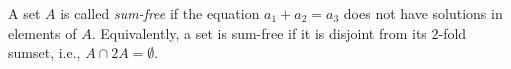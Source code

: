 \documentclass[12pt]{article}
\begin{document}
A set $A$ is called \emph{sum-free} if the equation $a_1+a_2=a_3$ does not have solutions in elements of $A$. Equivalently, a set is sum-free if it is disjoint from its $2$-fold sumset, i.e., $A \cap 2A =\emptyset$.
\end{document}
